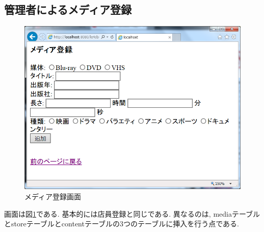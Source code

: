 \documentclass{jarticle}
\begin{document}
\subsection{管理者によるメディア登録}
\begin{figure}[tp]
\begin{center}
\includegraphics[scale=0.5]{add_media.png}
\end{center}
\caption{メディア登録画面}
\label{fig:add_media}
\end{figure}
画面は図\ref{fig:add_media}である. 基本的には店員登録と同じである. 異なるのは, mediaテーブルとstoreテーブルとcontentテーブルの3つのテーブルに挿入を行う点である.
\end{document}
